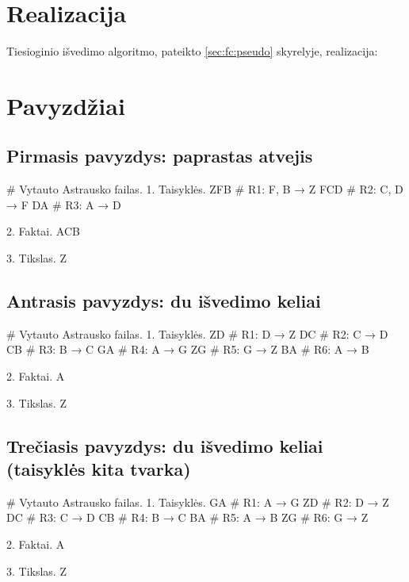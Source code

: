 \section{Realizacija}

Tiesioginio išvedimo algoritmo, pateikto \ref{sec:fc:pseudo}
skyrelyje, realizacija:


\section{Pavyzdžiai}

\subsection{Pirmasis pavyzdys: paprastas atvejis}

\begin{pythonaienv}[fc]
# Vytauto Astrausko failas.
1. Taisyklės.
ZFB                                     # R1: F, B → Z
FCD                                     # R2: C, D → F
DA                                      # R3: A → D

2. Faktai.
ACB

3. Tikslas.
Z
\end{pythonaienv}

\subsection{Antrasis pavyzdys: du išvedimo keliai}

\begin{pythonaienv}[fc]
# Vytauto Astrausko failas.
1. Taisyklės.
ZD                                      # R1: D → Z
DC                                      # R2: C → D
CB                                      # R3: B → C
GA                                      # R4: A → G
ZG                                      # R5: G → Z
BA                                      # R6: A → B

2. Faktai.
A

3. Tikslas.
Z
\end{pythonaienv}

\subsection{Trečiasis pavyzdys: du išvedimo keliai (taisyklės kita tvarka)}

\begin{pythonaienv}[fc]
# Vytauto Astrausko failas.
1. Taisyklės.
GA                                      # R1: A → G
ZD                                      # R2: D → Z
DC                                      # R3: C → D
CB                                      # R4: B → C
BA                                      # R5: A → B
ZG                                      # R6: G → Z

2. Faktai.
A

3. Tikslas.
Z
\end{pythonaienv}

